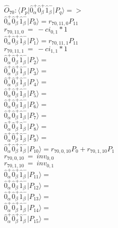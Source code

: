 \documentclass[14pt]{article}
\begin{document}
    $\hat{O}_{70}:  \langle{P_p}\vert \hat{0}_{\alpha}^{+}\hat{0}_{\beta}^{+}\hat{1}_{\beta}^{-} \vert{P_q}\rangle => $ \\ 
    $ \hat{0}_{\alpha}^{+}\hat{0}_{\beta}^{+}\hat{1}_{\beta}^{-} \vert{P_{0}}\rangle = {r}_{70,11,0}P_{11} $ \\ 
    ${r}_{70,11,0}\ =\ -{ci}_{0,1}*1 $ \\ 
    $ \hat{0}_{\alpha}^{+}\hat{0}_{\beta}^{+}\hat{1}_{\beta}^{-} \vert{P_{1}}\rangle = {r}_{70,11,1}P_{11} $ \\ 
    ${r}_{70,11,1}\ =\ -{ci}_{1,1}*1 $ \\ 
    $ \hat{0}_{\alpha}^{+}\hat{0}_{\beta}^{+}\hat{1}_{\beta}^{-} \vert{P_{2}}\rangle =  $ \\ 
    $ \hat{0}_{\alpha}^{+}\hat{0}_{\beta}^{+}\hat{1}_{\beta}^{-} \vert{P_{3}}\rangle =  $ \\ 
    $ \hat{0}_{\alpha}^{+}\hat{0}_{\beta}^{+}\hat{1}_{\beta}^{-} \vert{P_{4}}\rangle =  $ \\ 
    $ \hat{0}_{\alpha}^{+}\hat{0}_{\beta}^{+}\hat{1}_{\beta}^{-} \vert{P_{5}}\rangle =  $ \\ 
    $ \hat{0}_{\alpha}^{+}\hat{0}_{\beta}^{+}\hat{1}_{\beta}^{-} \vert{P_{6}}\rangle =  $ \\ 
    $ \hat{0}_{\alpha}^{+}\hat{0}_{\beta}^{+}\hat{1}_{\beta}^{-} \vert{P_{7}}\rangle =  $ \\ 
    $ \hat{0}_{\alpha}^{+}\hat{0}_{\beta}^{+}\hat{1}_{\beta}^{-} \vert{P_{8}}\rangle =  $ \\ 
    $ \hat{0}_{\alpha}^{+}\hat{0}_{\beta}^{+}\hat{1}_{\beta}^{-} \vert{P_{9}}\rangle =  $ \\ 
    $ \hat{0}_{\alpha}^{+}\hat{0}_{\beta}^{+}\hat{1}_{\beta}^{-} \vert{P_{10}}\rangle = {r}_{70,0,10}P_{0}+{r}_{70,1,10}P_{1} $ \\ 
    ${r}_{70,0,10}\ =\ {inv}_{0,0} $ \\ 
    ${r}_{70,1,10}\ =\ {inv}_{0,1} $ \\ 
    $ \hat{0}_{\alpha}^{+}\hat{0}_{\beta}^{+}\hat{1}_{\beta}^{-} \vert{P_{11}}\rangle =  $ \\ 
    $ \hat{0}_{\alpha}^{+}\hat{0}_{\beta}^{+}\hat{1}_{\beta}^{-} \vert{P_{12}}\rangle =  $ \\ 
    $ \hat{0}_{\alpha}^{+}\hat{0}_{\beta}^{+}\hat{1}_{\beta}^{-} \vert{P_{13}}\rangle =  $ \\ 
    $ \hat{0}_{\alpha}^{+}\hat{0}_{\beta}^{+}\hat{1}_{\beta}^{-} \vert{P_{14}}\rangle =  $ \\ 
    $ \hat{0}_{\alpha}^{+}\hat{0}_{\beta}^{+}\hat{1}_{\beta}^{-} \vert{P_{15}}\rangle =  $ \\ 
    
\end{document}
